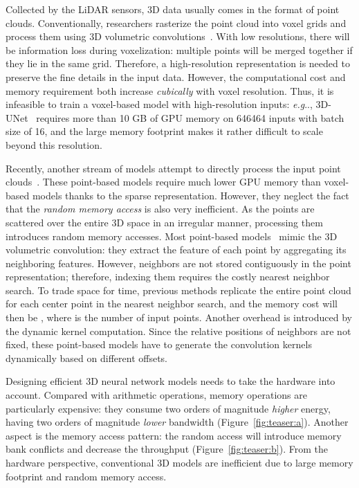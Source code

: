 \documentclass{article}
\makeatletter
\newcommand{\fig}[1]{Figure~\ref{#1}}
\DeclareRobustCommand\onedot{\futurelet\@let@token\@onedot}
\def\@onedot{\ifx\@let@token.\else.\null\fi\xspace}
\def\eg{\emph{e.g}\onedot} \def\Eg{\emph{E.g}\onedot}
\makeatother
\begin{document}
Collected by the LiDAR sensors, 3D data usually comes in the format of point clouds. Conventionally, researchers rasterize the point cloud into voxel grids and process them using 3D volumetric convolutions~\cite{Choy:2016us,Riegler:2017vk}. With low resolutions, there will be information loss during voxelization: multiple points will be merged together if they lie in the same grid. Therefore, a high-resolution representation is needed to preserve the fine details in the input data. However, the computational cost and memory requirement both increase \textit{cubically} with voxel resolution. Thus, it is infeasible to train a voxel-based model with high-resolution inputs: \eg, 3D-UNet~\cite{Cicek:2016un} requires more than 10 GB of GPU memory on 646464 inputs with batch size of 16, and the large memory footprint makes it rather difficult to scale beyond this resolution.

Recently, another stream of models attempt to directly process the input point clouds~\cite{Qi:2017vq,Qi:2017tf,Klokov:2017te,Li:2018tp}. These point-based models require much lower GPU memory than voxel-based models thanks to the sparse representation. However, they neglect the fact that the \textit{random memory access} is also very inefficient. As the points are scattered over the entire 3D space in an irregular manner, processing them introduces random memory accesses. Most point-based models~\cite{Li:2018tp} mimic the 3D volumetric convolution: they extract the feature of each point by aggregating its neighboring features. However, neighbors are not stored contiguously in the point representation; therefore, indexing them requires the costly nearest neighbor search. To trade space for time, previous methods replicate the entire point cloud for each center point in the nearest neighbor search, and the memory cost will then be , where  is the number of input points. Another overhead is introduced by the dynamic kernel computation. Since the relative positions of neighbors are not fixed, these point-based models have to generate the convolution kernels dynamically based on different offsets.

Designing efficient 3D neural network models needs to take the hardware into account. Compared with arithmetic operations, memory operations are particularly expensive: they consume two orders of magnitude \textit{higher} energy, having two orders of magnitude \textit{lower} bandwidth (\fig{fig:teaser:a}). Another aspect is the memory access pattern: the random access will introduce memory bank conflicts and decrease the throughput (\fig{fig:teaser:b}). From the hardware perspective, conventional 3D models are inefficient due to large memory footprint and random memory access.
\end{document}

